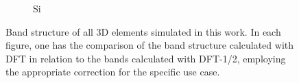 \begin{figure}[!ht]
\begin{subfigure}{0.3\textwidth}
  \caption{Si}
\end{subfigure}\hfil %
        \caption{Band structure of all 3D elements simulated in this work. In each figure, one has the comparison of the band structure calculated with DFT in relation to the bands calculated with DFT-1/2, employing the appropriate correction for the specific use case.}
        \label{fig:3d_compounds_bands}
\end{figure}